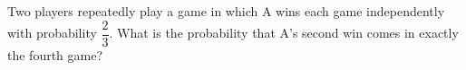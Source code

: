 Two players repeatedly play a game in which A wins each game independently with probability $\dfrac23$. What is the probability that A's second win comes in exactly the fourth game?
